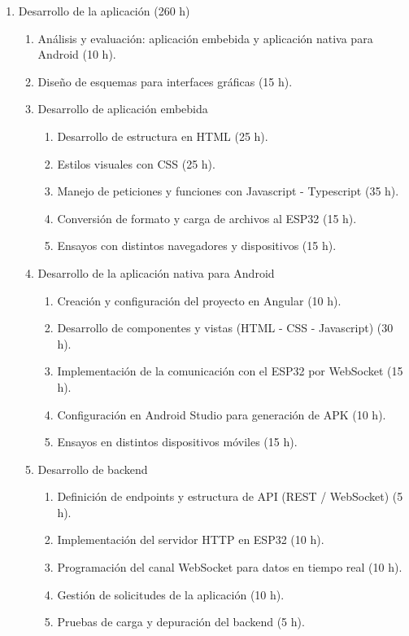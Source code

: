 \documentclass[
11pt, %
]{charter}
\begin{document}
\begin{enumerate}
\item Desarrollo de la aplicación (260 h)
	\begin{enumerate}
		\item Análisis y evaluación: aplicación embebida y aplicación nativa para Android (10 h).
		\item Diseño de esquemas para interfaces gráficas (15 h).
		\item Desarrollo de aplicación embebida
		\begin{enumerate}
			\item Desarrollo de estructura en HTML (25 h).
			\item Estilos visuales con CSS (25 h).
			\item Manejo de peticiones y funciones con Javascript - Typescript (35 h).
			\item Conversión de formato y carga de archivos al ESP32 (15 h).
			\item Ensayos con distintos navegadores y dispositivos (15 h).
		\end{enumerate}
		\item Desarrollo de la aplicación nativa para Android
		\begin{enumerate}
			\item Creación y configuración del proyecto en Angular (10 h).
			\item Desarrollo de componentes y vistas (HTML - CSS - Javascript) (30 h).
			\item Implementación de la comunicación con el ESP32 por WebSocket (15 h).
			\item Configuración en Android Studio para generación de APK (10 h).
			\item Ensayos en distintos dispositivos móviles (15 h).
		\end{enumerate}
		\item Desarrollo de backend
		\begin{enumerate}
			\item Definición de endpoints y estructura de API (REST / WebSocket) (5 h).
			\item Implementación del servidor HTTP en ESP32 (10 h).
			\item Programación del canal WebSocket para datos en tiempo real (10 h).
			\item Gestión de solicitudes de la aplicación (10 h).
			\item Pruebas de carga y depuración del backend (5 h).
		\end{enumerate}	
	\end{enumerate}

\end{enumerate}
\end{document}
